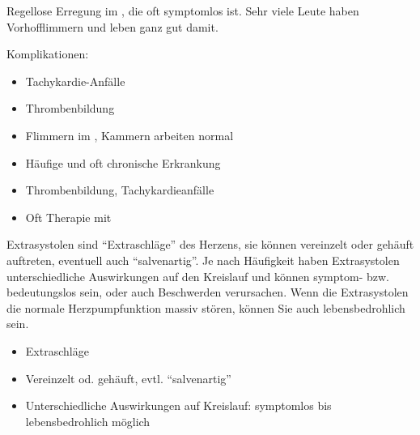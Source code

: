 {
\label{topic:vorhofflimmern}

Regellose Erregung im , die oft symptomlos ist. 
Sehr viele Leute haben Vorhofflimmern und leben ganz gut damit.

Komplikationen:
\begin{itemize}
  \item Tachykardie-Anfälle
  \item Thrombenbildung
\end{itemize}
}
{%
\begin{itemize}
  \item Flimmern im , Kammern arbeiten normal
  \item Häufige und oft chronische Erkrankung
  \item Thrombenbildung, Tachykardieanfälle
  \item Oft Therapie mit 
\end{itemize}

}{}{}{}


{%
\label{topic:extrasystolen}
Extrasystolen sind \enquote{Extraschläge} des Herzens, sie können
vereinzelt oder gehäuft auftreten, eventuell auch
\enquote{salvenartig}. Je nach Häufigkeit haben Extrasystolen
unterschiedliche Auswirkungen auf den Kreislauf und können
symptom- bzw. bedeutungslos sein, oder auch Beschwerden
verursachen. Wenn die Extrasystolen die normale
Herzpumpfunktion massiv stören, können Sie auch
lebensbedrohlich sein.
}
{%
\begin{itemize}
  \item Extraschläge
  \item Vereinzelt od. gehäuft, evtl. \enquote{salvenartig}
  \item Unterschiedliche Auswirkungen auf Kreislauf: symptomlos bis
  lebensbedrohlich möglich
\end{itemize}

}{}{}{}


